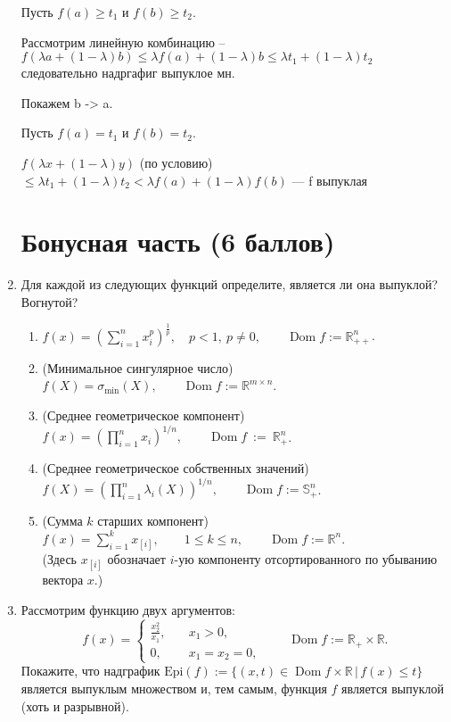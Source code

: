 \documentclass{article}
\newcommand{\R}{\mathbb{R}}
\renewcommand{\S}{\mathbb{S}}
\DeclareMathOperator*{\Dom}{Dom}
\begin{document}
\begin{enumerate}[label=\textbf{\arabic*}, leftmargin=0em]
Пусть $f(a) \geq t_1$ и $f(b) \geq t_2$.

Рассмотрим линейную комбинацию -- $f(\lambda a + (1 - \lambda) b) \leq \lambda f(a) + (1- \lambda) b \leq \lambda t_1 + (1 - \lambda) t_2$ следовательно надргафиг выпуклое мн.


Покажем b -> a.

Пусть $f(a) = t_1$ и $f(b) = t_2$.

$f(\lambda x + (1 - \lambda) y) $ (по условию) $ \leq \lambda t_1 + (1 - \lambda) t_2 < \lambda f(a) + (1 - \lambda) f(b)$ — f выпуклая






\bigskip

\section*{Бонусная часть (6 баллов)}

\item Для каждой из следующих функций определите, является ли она выпуклой? Вогнутой?
\begin{enumerate}
\item $\displaystyle f(x) = \left( \sum_{i=1}^n x_i^p \right)^{\frac{1}{p}}, \quad p < 1, \ p \neq 0, \qquad \Dom f := \R_{++}^n$.

\item (Минимальное сингулярное число) $f(X) = \sigma_{\min}(X), \qquad \Dom f := \R^{m \times n}$.

\item (Среднее геометрическое компонент) $\displaystyle f(x) = \left(\prod_{i=1}^n x_i \right)^{1/n}, \qquad \Dom f~:=~\R_{+}^n$.

\item (Среднее геометрическое собственных значений) $\displaystyle f(X) = \left( \prod_{i=1}^n \lambda_i(X) \right)^{1/n}, \qquad \Dom f := \S^n_{+}$.

\item (Сумма $k$ старших компонент) $\displaystyle f(x) = \sum_{i=1}^k x_{[i]}, \qquad 1 \leqslant k \leqslant n, \qquad \Dom f := \R^n$.\\
(Здесь $x_{[i]}$ обозначает $i$-ую компоненту отсортированного по убыванию вектора $x$.)
\end{enumerate}

\item Рассмотрим функцию двух аргументов:
\begin{equation}
f(x) =
\begin{cases}
\frac{x_2^2}{x_1}, \quad &x_1 > 0, \\
0, \quad &x_1 = x_2 = 0,
\end{cases} \qquad \Dom f := \R_+ \times \R.
\end{equation}
Покажите, что надграфик $\text{Epi}(f) := \{ (x, t) \in \Dom f \times \R \, | \, f(x) \leqslant t  \}$ является выпуклым множеством и, тем самым, функция $f$ является выпуклой (хоть и разрывной).


\end{enumerate}
\end{document}
